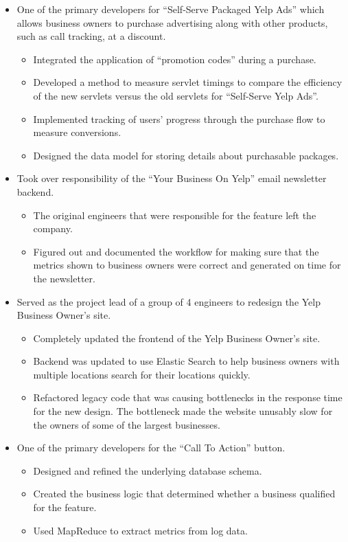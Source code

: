 \documentclass{article}
\newenvironment{changemargin}[2]{%
  \begin{list}{}{%
    \setlength{\topsep}{0pt}%
    \setlength{\leftmargin}{#1}%
    \setlength{\rightmargin}{#2}%
    \setlength{\listparindent}{\parindent}%
    \setlength{\itemindent}{\parindent}%
    \setlength{\parsep}{\parskip}%
  }%
  \item[]}{\end{list}
}
\newenvironment{body} {
  \vspace*{-16pt}
  \begin{changemargin}{-0.25in}{-0.5in}
  }
  {\end{changemargin}
}
\begin{document}
\begin{body}
\begin{itemize}
    \item One of the primary developers for ``Self-Serve Packaged Yelp Ads'' which allows business owners to purchase advertising along with other products, such as call tracking, at a discount.
    \begin{itemize} \itemsep -0pt
      \item Integrated the application of ``promotion codes'' during a purchase.
      \item Developed a method to measure servlet timings to compare the efficiency of the new servlets versus the old servlets for ``Self-Serve Yelp Ads''.
      \item Implemented tracking of users' progress through the purchase flow to measure conversions.
      \item Designed the data model for storing details about purchasable packages.
    \end{itemize}

    \item Took over responsibility of the ``Your Business On Yelp'' email newsletter backend.
    \begin{itemize} \itemsep -0pt
      \item The original engineers that were responsible for the feature left the company.
      \item Figured out and documented the workflow for making sure that the metrics shown to business owners were correct and generated on time for the newsletter.
    \end{itemize}

    \item Served as the project lead of a group of 4 engineers to redesign the Yelp Business Owner's site.
    \begin{itemize} \itemsep -0pt
      \item Completely updated the frontend of the Yelp Business Owner's site.
      \item Backend was updated to use Elastic Search to help business owners with multiple locations search for their locations quickly.
      \item Refactored legacy code that was causing bottlenecks in the response time for the new design. The bottleneck made the website unusably slow for the owners of some of the largest businesses.
    \end{itemize}

    \item One of the primary developers for the ``Call To Action'' button.
    \begin{itemize} \itemsep -0pt
      \item Designed and refined the underlying database schema.
      \item Created the business logic that determined whether a business qualified for the feature.
      \item Used MapReduce to extract metrics from log data.
    \end{itemize}


\end{itemize}
\end{body}
\end{document}
